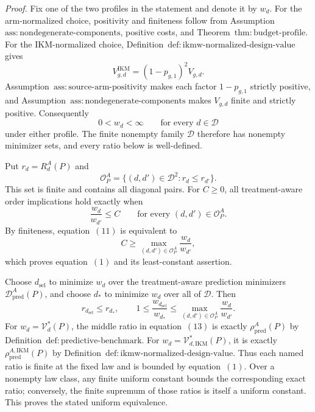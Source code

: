 \emph{Proof.}
Fix one of the two profiles in the statement and denote it by \(w_d\).  For the arm-normalized choice, positivity and finiteness follow from Assumption~\(\mathrm{ass{:}nondegenerate\text{-}components}\), positive costs, and Theorem~\(\mathrm{thm{:}budget\text{-}profile}\).  For the IKM-normalized choice, Definition~\(\mathrm{def{:}ikmw\text{-}normalized\text{-}design\text{-}value}\) gives
\[
 V_{g,d}^{\mathrm{IKM}}=(1-p_{g,1})^2V_{g,d}.
\]
Assumption~\(\mathrm{ass{:}source\text{-}arm\text{-}positivity}\) makes each factor \(1-p_{g,1}\) strictly positive, and Assumption~\(\mathrm{ass{:}nondegenerate\text{-}components}\) makes \(V_{g,d}\) finite and strictly positive.  Consequently
\[
 0<w_d<\infty
 \qquad\text{for every }d\in\mathcal D                 \tag{10}
\]
under either profile.  The finite nonempty family \(\mathcal D\) therefore has nonempty minimizer sets, and every ratio below is well-defined.

Put \(r_d=R_d^A(P)\) and
\[
 \mathcal O_P^A=\{(d,d')\in\mathcal D^2:r_d\le r_{d'}\}.
\]
This set is finite and contains all diagonal pairs.  For \(C\ge0\), all treatment-aware order implications hold exactly when
\[
 \frac{w_d}{w_{d'}}\le C
 \qquad\text{for every }(d,d')\in\mathcal O_P^A.          \tag{11}
\]
By finiteness, equation~\((11)\) is equivalent to
\[
 C\ge
 \max_{(d,d')\in\mathcal O_P^A}\frac{w_d}{w_{d'}},       \tag{12}
\]
which proves equation~\((1)\) and its least-constant assertion.

Choose \(d_{\mathrm{sel}}\) to minimize \(w_d\) over the treatment-aware prediction minimizers \(\mathcal D_{\mathrm{pred}}^A(P)\), and choose \(d_*\) to minimize \(w_d\) over all of \(\mathcal D\).  Then
\[
 r_{d_{\mathrm{sel}}}\le r_{d_*},
 \qquad
 1\le\frac{w_{d_{\mathrm{sel}}}}{w_{d_*}}
 \le \max_{(d,d')\in\mathcal O_P^A}\frac{w_d}{w_{d'}}.  \tag{13}
\]
For \(w_d=\mathcal V_d^*(P)\), the middle ratio in equation~\((13)\) is exactly \(\rho_{\mathrm{pred}}^A(P)\) by Definition~\(\mathrm{def{:}predictive\text{-}benchmark}\).  For \(w_d=\mathcal V_{d,\mathrm{IKM}}^*(P)\), it is exactly \(\rho_{\mathrm{pred}}^{A,\mathrm{IKM}}(P)\) by Definition~\(\mathrm{def{:}ikmw\text{-}normalized\text{-}design\text{-}value}\).  Thus each named ratio is finite at the fixed law and is bounded by equation~\((1)\).  Over a nonempty law class, any finite uniform constant bounds the corresponding exact ratio; conversely, the finite supremum of those ratios is itself a uniform constant.  This proves the stated uniform equivalence.

